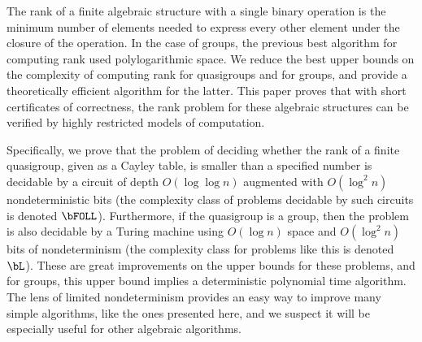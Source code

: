%
The rank of a finite algebraic structure with a single binary operation is the minimum number of elements needed to express every other element under the closure of the operation.
In the case of groups, the previous best algorithm for computing rank used polylogarithmic space.
We reduce the best upper bounds on the complexity of computing rank for quasigroups and for groups, and provide a theoretically efficient algorithm for the latter.
This paper proves that with short certificates of correctness, the rank problem for these algebraic structures can be verified by highly restricted models of computation.

%
Specifically, we prove that the problem of deciding whether the rank of a finite quasigroup, given as a Cayley table, is smaller than a specified number is decidable by a circuit of depth $O(\log \log n)$ augmented with $O(\log^2 n)$ nondeterministic bits (the complexity class of problems decidable by such circuits is denoted $\bFOLL$).
Furthermore, if the quasigroup is a group, then the problem is also decidable by a Turing machine using $O(\log n)$ space and $O(\log^2 n)$ bits of nondeterminism (the complexity class for problems like this is denoted $\bL$).
These are great improvements on the upper bounds for these problems, and for groups, this upper bound implies a deterministic polynomial time algorithm.
The lens of limited nondeterminism provides an easy way to improve many simple algorithms, like the ones presented here, and we suspect it will be especially useful for other algebraic algorithms.
